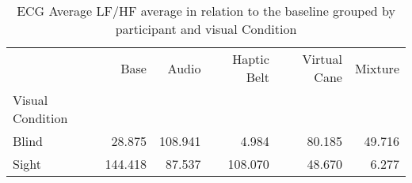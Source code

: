 
\begin{table}[!htb]
\centering
\caption{ECG Average LF/HF average in relation to the baseline grouped by participant and visual Condition}
\label{tab:ecg_lfhf_average_group}
\begin{tabular}{lrrrrr}
\toprule
{} &    Base &   Audio &  Haptic Belt &  Virtual Cane &  Mixture \\
Visual Condition &         &         &              &               &          \\
\midrule
Blind            &  28.875 & 108.941 &        4.984 &        80.185 &   49.716 \\
Sight            & 144.418 &  87.537 &      108.070 &        48.670 &    6.277 \\
\bottomrule
\end{tabular}
\end{table}

